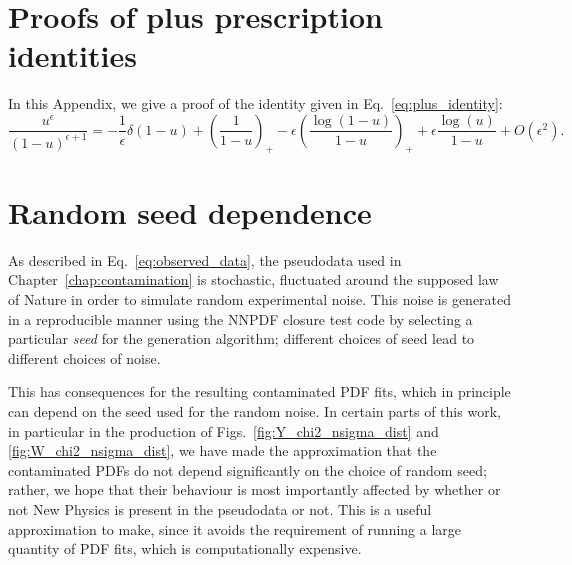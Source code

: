 \documentclass[withindex,glossary]{cam-thesis}
\begin{document}
%

\renewcommand{\bibname}{References}
\cleardoublepage
{}
{}






\appendix

\chapter{Proofs of plus prescription identities}
\label{app:plus_prescription}
In this Appendix, we give a proof of the identity given in Eq.~\eqref{eq:plus_identity}:
\begin{equation}
\label{eq:plus_identity_2}
\frac{u^{\epsilon}}{(1-u)^{\epsilon+1}} = -\frac{1}{\epsilon} \delta(1-u) + \left( \frac{1}{1-u} \right)_+ - \epsilon \left( \frac{\log(1-u)}{1-u} \right)_+ + \epsilon \frac{\log(u)}{1-u} + O(\epsilon^2).
\end{equation}


\chapter{Random seed dependence}
\label{app:random}
As described in Eq.~\eqref{eq:observed_data}, the pseudodata used in Chapter~\ref{chap:contamination} is stochastic, fluctuated around the supposed law of Nature in order to simulate random experimental noise. This noise is generated in a reproducible manner using the NNPDF closure test code by selecting a particular \textit{seed} for the generation algorithm; different choices of seed lead to different choices of noise.

This has consequences for the resulting contaminated PDF fits, which in principle can depend on the seed used for the random noise. In certain parts of this work, in particular in the production of Figs.~\ref{fig:Y_chi2_nsigma_dist} and \ref{fig:W_chi2_nsigma_dist}, we have made the approximation that the contaminated PDFs do not depend significantly on the choice of random seed; rather, we hope that their behaviour is most importantly affected by whether or not New Physics is present in the pseudodata or not. This is a useful approximation to make, since it avoids the requirement of running a large quantity of PDF fits, which is computationally expensive.
\end{document}
